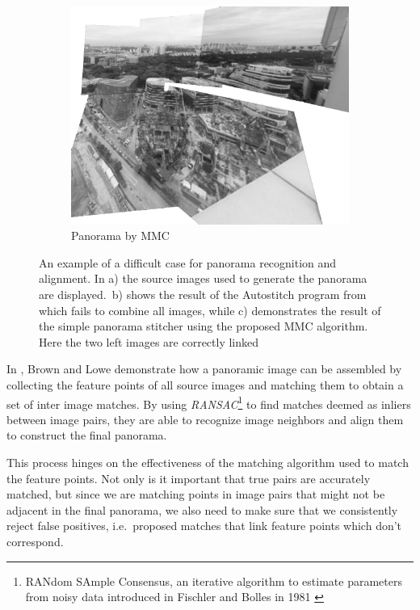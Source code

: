 \documentclass{article}
\begin{document}
\begin{figure}[h]
\begin{subfigure}{0.4\textwidth}
    \end{subfigure}%
	~%
	\begin{subfigure}{0.4\textwidth}
		\includegraphics[width=\textwidth]{images/panorama-MMC}
		\caption{Panorama by MMC}
		\label{fig:pano_MMC}
	\end{subfigure}%
    \label{fig:pano_example}
	\caption{An example of a difficult case for panorama recognition and 
		alignment.  In a) the source images used to generate the 
		panorama are displayed.\ b) shows the result of the Autostitch 
		program from \cite{brown2007automatic} which fails to combine 
		all images, while c) demonstrates the result of the simple 
		panorama stitcher
	using the proposed MMC algorithm. Here the two left images are 
correctly linked}
\end{figure}

In \cite{brown2007automatic}, Brown and Lowe demonstrate how a panoramic 
image can be assembled by collecting the feature points of all source 
images and matching them to obtain a set of inter image matches.  By 
using \emph{RANSAC}\footnote{RANdom SAmple Consensus, an iterative 
    algorithm to estimate parameters from noisy data introduced in 
Fischler and Bolles in 1981 \cite{fischler1981ransac}} to find matches 
deemed as inliers between image pairs, they are able to recognize image 
neighbors and align them to construct the final panorama.

This process hinges on the effectiveness of the matching algorithm used 
to match the feature points. Not only is it important that true pairs 
are accurately matched, but since we are matching points in image pairs 
that might not be adjacent in the final panorama, we also need to make 
sure that we consistently reject false positives, i.e.\ proposed matches 
that link feature points which don't correspond.
\end{document}
